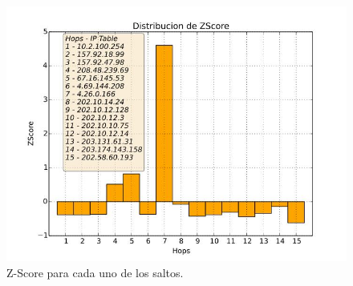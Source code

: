 \begin{figure}[H]
  \centering	
	\includegraphics[scale=0.5]{../australia-experiment/bar_z_score.jpeg}
  \caption{Z-Score para cada uno de los saltos.}
	\label{fig:histo-src-sitiotrabajo}
\end{figure}

